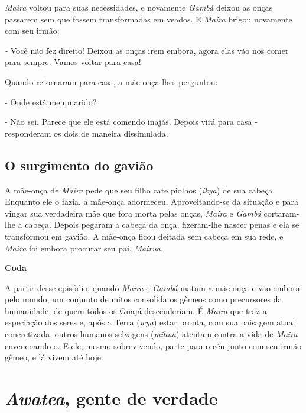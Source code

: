 \emph{Maira} voltou para suas necessidades, e novamente \emph{Gambá}
deixou as onças passarem sem que fossem transformadas em veados. E
\emph{Maira} brigou novamente com seu irmão:

\emph{-} Você não fez direito! Deixou as onças irem embora, agora elas
vão nos comer para sempre. Vamos voltar para casa!

Quando retornaram para casa, a mãe-onça lhes perguntou:

- Onde está meu marido?

- Não sei. Parece que ele está comendo inajás. Depois virá para casa -
responderam os dois de maneira dissimulada.

\subsection{O surgimento do gavião}

A mãe-onça de \emph{Maira} pede que seu filho cate piolhos (\emph{ikya})
de sua cabeça. Enquanto ele o fazia, a mãe-onça adormeceu.
Aproveitando-se da situação e para vingar sua verdadeira mãe que fora
morta pelas onças, \emph{Maira} e \emph{Gambá} cortaram-lhe a cabeça.
Depois pegaram a cabeça da onça, fizeram-lhe nascer penas e ela se
transformou em gavião. A mãe-onça ficou deitada sem cabeça em sua rede,
e \emph{Maira} foi embora procurar seu pai, \emph{Mairua}.

\textbf{Coda}

A partir desse episódio, quando \emph{Maira} e \emph{Gambá} matam a
mãe-onça e vão embora pelo mundo, um conjunto de mitos consolida os
gêmeos como precursores da humanidade, de quem todos os Guajá
descenderiam. É \emph{Maira} que traz a especiação dos seres e, após a
Terra (\emph{wya}) estar pronta, com sua paisagem atual concretizada,
outros humanos selvagens (\emph{mihua}) atentam contra a vida de
\emph{Maira} envenenando-o. E ele, mesmo sobrevivendo, parte para o céu
junto com seu irmão gêmeo, e lá vivem até hoje.

\section{\emph{Awatea}, gente de verdade}\label{awatea-gente-de-verdade}

